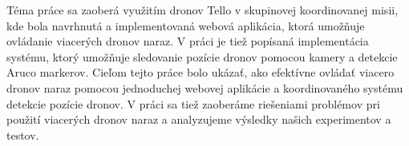 \documentclass[]{tukediphc}
\begin{document}
\predhovor 
Téma práce sa zaoberá využitím dronov Tello v skupinovej koordinovanej misii, kde bola navrhnutá a implementovaná webová aplikácia, ktorá umožňuje ovládanie viacerých dronov naraz. V práci je tiež popísaná implementácia systému, ktorý umožňuje sledovanie pozície dronov pomocou kamery a detekcie Aruco markerov.
Cieľom tejto práce bolo ukázať, ako efektívne ovládať viacero dronov naraz pomocou jednoduchej webovej aplikácie a koordinovaného systému detekcie pozície dronov. V práci sa tiež zaoberáme riešeniami problémov pri použití viacerých dronov naraz a analyzujeme výsledky našich experimentov a testov.
\kpredhovoru

\thispagestyle{empty}
\tableofcontents
\thispagestyle{empty}

\newpage

\thispagestyle{empty}

{	\makeatletter
	\renewcommand{\l@figure}{\@dottedtocline{1}{1.5em}{3.5em}}
	\makeatother
	\listoffigures}



\newpage

\thispagestyle{empty}
\listoftables

\thispagestyle{empty}
\newpage
 
\thispagestyle{empty}
\printglossary %
\newpage

\slovnikterminov
\end{document}
